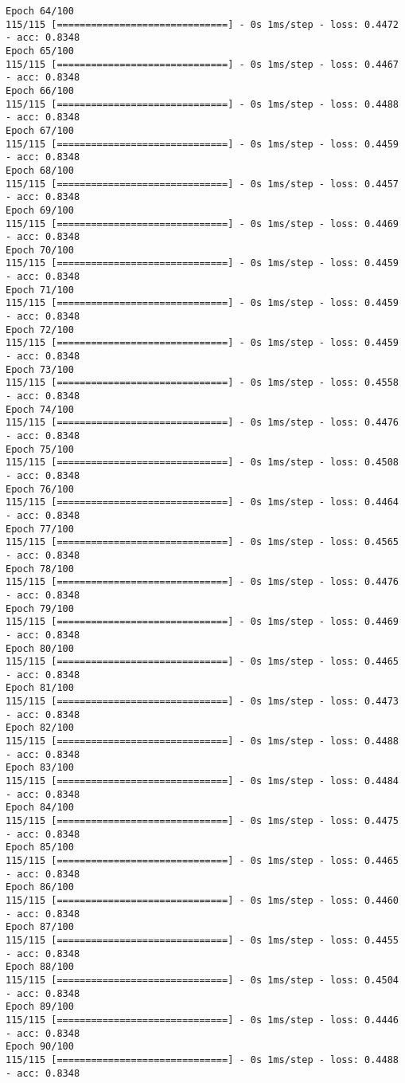 \documentclass[11pt]{article}
\begin{document}
\begin{Verbatim}[commandchars=\\\{\}]
Epoch 64/100
115/115 [==============================] - 0s 1ms/step - loss: 0.4472 - acc: 0.8348
Epoch 65/100
115/115 [==============================] - 0s 1ms/step - loss: 0.4467 - acc: 0.8348
Epoch 66/100
115/115 [==============================] - 0s 1ms/step - loss: 0.4488 - acc: 0.8348
Epoch 67/100
115/115 [==============================] - 0s 1ms/step - loss: 0.4459 - acc: 0.8348
Epoch 68/100
115/115 [==============================] - 0s 1ms/step - loss: 0.4457 - acc: 0.8348
Epoch 69/100
115/115 [==============================] - 0s 1ms/step - loss: 0.4469 - acc: 0.8348
Epoch 70/100
115/115 [==============================] - 0s 1ms/step - loss: 0.4459 - acc: 0.8348
Epoch 71/100
115/115 [==============================] - 0s 1ms/step - loss: 0.4459 - acc: 0.8348
Epoch 72/100
115/115 [==============================] - 0s 1ms/step - loss: 0.4459 - acc: 0.8348
Epoch 73/100
115/115 [==============================] - 0s 1ms/step - loss: 0.4558 - acc: 0.8348
Epoch 74/100
115/115 [==============================] - 0s 1ms/step - loss: 0.4476 - acc: 0.8348
Epoch 75/100
115/115 [==============================] - 0s 1ms/step - loss: 0.4508 - acc: 0.8348
Epoch 76/100
115/115 [==============================] - 0s 1ms/step - loss: 0.4464 - acc: 0.8348
Epoch 77/100
115/115 [==============================] - 0s 1ms/step - loss: 0.4565 - acc: 0.8348
Epoch 78/100
115/115 [==============================] - 0s 1ms/step - loss: 0.4476 - acc: 0.8348
Epoch 79/100
115/115 [==============================] - 0s 1ms/step - loss: 0.4469 - acc: 0.8348
Epoch 80/100
115/115 [==============================] - 0s 1ms/step - loss: 0.4465 - acc: 0.8348
Epoch 81/100
115/115 [==============================] - 0s 1ms/step - loss: 0.4473 - acc: 0.8348
Epoch 82/100
115/115 [==============================] - 0s 1ms/step - loss: 0.4488 - acc: 0.8348
Epoch 83/100
115/115 [==============================] - 0s 1ms/step - loss: 0.4484 - acc: 0.8348
Epoch 84/100
115/115 [==============================] - 0s 1ms/step - loss: 0.4475 - acc: 0.8348
Epoch 85/100
115/115 [==============================] - 0s 1ms/step - loss: 0.4465 - acc: 0.8348
Epoch 86/100
115/115 [==============================] - 0s 1ms/step - loss: 0.4460 - acc: 0.8348
Epoch 87/100
115/115 [==============================] - 0s 1ms/step - loss: 0.4455 - acc: 0.8348
Epoch 88/100
115/115 [==============================] - 0s 1ms/step - loss: 0.4504 - acc: 0.8348
Epoch 89/100
115/115 [==============================] - 0s 1ms/step - loss: 0.4446 - acc: 0.8348
Epoch 90/100
115/115 [==============================] - 0s 1ms/step - loss: 0.4488 - acc: 0.8348

\end{Verbatim}
\end{document}
